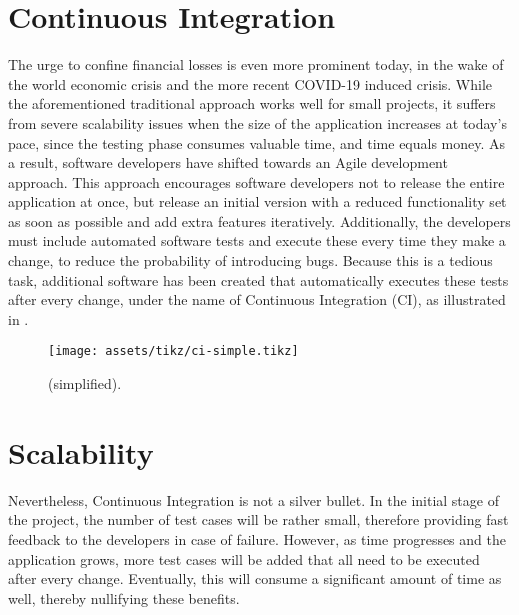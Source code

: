 \section*{Continuous Integration}
The urge to confine financial losses is even more prominent today, in the wake of the world economic crisis and the more recent COVID-19 induced crisis. While the aforementioned traditional approach works well for small projects, it suffers from severe scalability issues when the size of the application increases at today's pace, since the testing phase consumes valuable time, and time equals money. As a result, software developers have shifted towards an Agile development approach. This approach encourages software developers not to release the entire application at once, but release an initial version with a reduced functionality set as soon as possible and add extra features iteratively. Additionally, the developers must include automated software tests and execute these every time they make a change, to reduce the probability of introducing bugs. Because this is a tedious task, additional software has been created that automatically executes these tests after every change, under the name of Continuous Integration (CI), as illustrated in .

\begin{figure}[h!]
	\centering
	\texttt{[image: assets/tikz/ci-simple.tikz]}
	\caption{\CI{} (simplified).}
	\label{fig:ci}
\end{figure}

\section*{Scalability}
Nevertheless, Continuous Integration is not a silver bullet. In the initial stage of the project, the number of test cases will be rather small, therefore providing fast feedback to the developers in case of failure. However, as time progresses and the application grows, more test cases will be added that all need to be executed after every change. Eventually, this will consume a significant amount of time as well, thereby nullifying these benefits.

